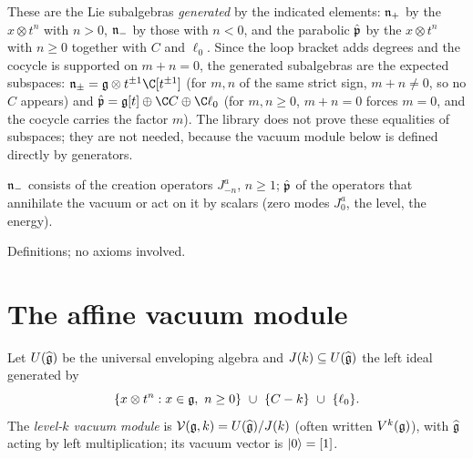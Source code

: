 \begin{dictionary}
These are the Lie subalgebras \emph{generated} by the indicated elements: $\mathfrak{n}_+$ by the
$x\otimes t^n$ with $n>0$, $\mathfrak{n}_-$ by those with $n<0$, and the parabolic $\hat{\mathfrak{p}}$ by the
$x\otimes t^n$ with $n\ge0$ together with $C$ and $\ell_0$. Since the loop bracket adds degrees and
the cocycle is supported on $m+n = 0$, the generated subalgebras are the expected subspaces:
$\ltwon_\pm = \ltwog\otimes t^{\pm1}\C[t^{\pm1}]$ (for $m,n$ of the same strict sign, $m+n\ne0$, so no $C$
appears) and $\hat{\ltwop} = \ltwog[t]\oplus\C C\oplus\C\ell_0$ (for $m,n\ge0$, $m+n = 0$ forces $m = 0$,
and the cocycle carries the factor $m$). The library does not prove these equalities of
subspaces; they are not needed, because the vacuum module below is defined directly by
generators.
\end{dictionary}

\begin{physics}
$\mathfrak{n}_-$ consists of the creation operators $J^a_{-n}$, $n\ge1$; $\hat{\mathfrak{p}}$ of the operators that
annihilate the vacuum or act on it by scalars (zero modes $J^a_0$, the level, the energy).
\end{physics}

\begin{status}
Definitions; no axioms involved.
\end{status}

\section{The affine vacuum module}\label{l02:sec:vacuum}

\begin{definition}\label{l02:def:vacuum}
Let $U(\widehat{\mathfrak{g}})$ be the universal enveloping algebra and $J(k)\subseteq U(\widehat{\mathfrak{g}})$ the left ideal
generated by
\begin{equation*}
 \{x\otimes t^n : x\in\mathfrak{g},\ n\ge0\}\ \cup\ \{C - k\}\ \cup\ \{\ell_0\}.
\end{equation*}
The \emph{level-$k$ vacuum module} is $\mathcal{V}(\mathfrak{g},k) = U(\widehat{\mathfrak{g}})/J(k)$ (often written
$V^k(\mathfrak{g})$), with $\widehat{\mathfrak{g}}$ acting by left multiplication; its vacuum vector is $|0\rangle = [1]$.
\end{definition}


